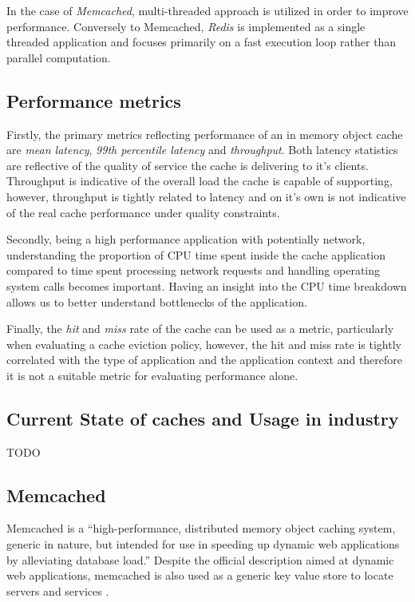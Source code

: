 In the case of \textit{Memcached}, multi-threaded approach is utilized in order to improve performance. Conversely to Memcached, \textit{Redis} is implemented as a single threaded application and focuses primarily on a fast execution loop rather than parallel computation.


\subsection{Performance metrics}
Firstly, the primary metrics reflecting performance of an in memory object cache are \textit{mean latency}, \textit{99th percentile latency} and \textit{throughput}. Both latency statistics are reflective of the quality of service the cache is delivering to it's clients. Throughput is indicative of the overall load the cache is capable of supporting, however, throughput is tightly related to latency and on it's own is not indicative of the real cache performance under quality constraints.

Secondly, being a high performance application with potentially network, understanding the proportion of CPU time spent inside the cache application compared to time spent processing network requests and handling operating system calls becomes important. Having an insight into the CPU time breakdown allows us to better understand bottlenecks of the application.

Finally, the \textit{hit} and \textit{miss} rate of the cache can be used as a metric, particularly when evaluating a cache eviction policy, however, the hit and miss rate is tightly correlated with the type of application and the application context and therefore it is not a suitable metric for evaluating performance alone.


\subsection{Current State of caches and Usage in industry}
TODO


\subsection{Memcached}

Memcached is a ``high-performance, distributed memory object caching system, generic in nature, but intended for use in speeding up dynamic web applications by alleviating database load.'' \cite{interactive2006memcached} Despite the official description aimed at dynamic web applications, memcached is also used as a generic key value store to locate servers and services \cite{atikoglu2012workload}.


